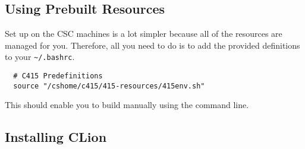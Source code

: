 \documentclass[../setup.tex]{subfiles}
\begin{document}
\subsection{Using Prebuilt Resources}
Set up on the CSC machines is a lot simpler because all of the resources are managed for you.
Therefore, all you need to do is to add the provided definitions to your \lstinline{~/.bashrc}.
\begin{lstlisting}
  # C415 Predefinitions
  source "/cshome/c415/415-resources/415env.sh"
\end{lstlisting}
This should enable you to build manually using the command line.

\subsection{Installing CLion}
\end{document}

